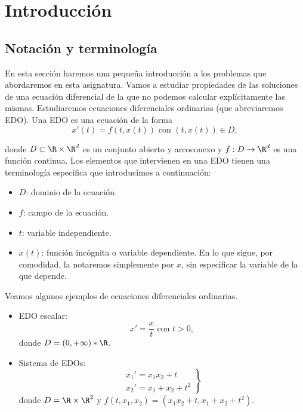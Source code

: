 \documentclass{article}
\begin{document}
\maketitle

\section{Introducción}

\subsection{Notación y terminología}

En esta sección haremos una pequeña introducción a los problemas que abordaremos en esta
asignatura. Vamos a estudiar propiedades de las soluciones de una ecuación diferencial de la que no
podemos calcular explícitamente las mismas. Estudiaremos ecuaciones diferenciales ordinarias (que
abreviaremos EDO). Una EDO es una ecuación de la forma
\[x'(t) = f(t,x(t)) \text{ con } (t,x(t)) \in D,\]

donde $D \subset \R \times \R^d$ es un conjunto abierto y arcoconexo y $f: D \to \R^d$ es una
función continua. Los elementos que intervienen en una EDO tienen una terminología específica que
introducimos a continuación:

\begin{itemize}
\item $D$: dominio de la ecuación.
\item $f$: campo de la ecuación.
\item $t$: variable independiente.
\item $x(t)$: función incógnita o variable dependiente. En lo que sigue, por comodidad, la notaremos
  simplemente por $x$, sin especificar la variable de la que depende.
\end{itemize}

\begin{ex} Veamos algunos ejemplos de ecuaciones diferenciales ordinarias.
  
  \begin{itemize}
  \item EDO escalar:
    \[x' = \frac{x}{t} \text{ con } t > 0,\] donde $D = (0, +\infty)* \R$.
  \item Sistema de EDOs:
    \[
      \left.
        \begin{array}{r}
          x_1' = x_1x_2 + t \\
          x_2' = x_1 + x_2 + t^2
        \end{array}
      \right\}
    \]
    donde $D = \R \times \R^2$ y $f(t, x_1, x_2) = (x_1x_2 + t, x_1 + x_2 + t^2)$. \qedhere
  \end{itemize}
\end{ex}
\end{document}

